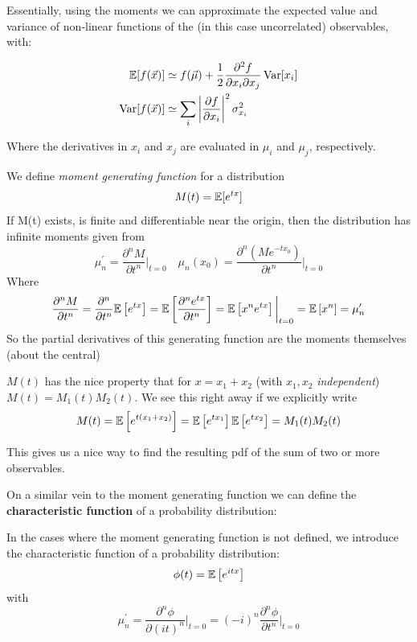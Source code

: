 Essentially, using the moments we can approximate the expected value and variance of non-linear functions of the (in this case uncorrelated) observables, with:

\begin{align*}
\mathbb{E}[f(\vec{x})] &\simeq f(\vec{\mu}) + \frac{1}{2}\frac{\partial^2f}{\partial x_i \partial x_j}\operatorname{Var}[x_i] \\
\operatorname{Var}[f(\vec{x})] &\simeq \sum_i \left| \frac{\partial f}{\partial x_i} \right|^2\sigma_{x_i}^2
\end{align*}

Where the derivatives in $x_i$ and $x_j$ are evaluated in $\mu_i$ and $\mu_j$, respectively.
\begin{definition}
	We define \emph{moment generating function} for a distribution 
	\[
	M(t) = \mathbb{E}[e^{tx}]
	\]
	If M(t) exists, is finite and differentiable near the origin, then the distribution has infinite moments given from
	\[
	\mu^\prime_n = \frac{\partial^n M}{\partial t^n}\bigg\rvert_{t=0} \quad \mu_n(x_0) = \frac{\partial^n \left( Me^{-tx_0} \right)}{\partial t^n}\bigg\rvert_{t=0}
	\]
	Where
	\[
	\frac{\partial^n M}{\partial t^n} = \frac{\partial^n}{\partial t^n} \mathbb{E}\left[e^{tx}\right] =  \mathbb{E}\left[\frac{\partial^ne^{tx}}{\partial t^n}\right] = \mathbb{E}\left[x^ne^{tx}\right]\bigg\rvert_{t=0} = \mathbb{E}\left[ x^n \right] = \mu_n^\prime
	\]
	So the partial derivatives of this generating function are the moments themselves (about the central)
\end{definition}
	
$M(t)$ has the nice property that for $x=x_1+x_2$ (with $x_1,x_2$ \emph{independent}) $M(t)=M_1(t)M_2(t)$. We see this right away if we explicitly write 
	\[
	M(t) = \mathbb{E}\left[ e^{t(x_1+x_2)}\right] = \mathbb{E}\left[ e^{tx_1}\right]\mathbb{E}\left[ e^{tx_2}\right] = M_1(t)M_2(t)
	\]
	
This gives us a nice way to find the resulting pdf of the sum of two or more observables.

On a similar vein to the moment generating function we can define the \textbf{characteristic function} of a probability distribution:

\begin{definition}
	In the cases where the moment generating function is not defined, we introduce the characteristic function of a probability distribution:
	\[
	\phi(t) = \mathbb{E}\left[ e^{itx} \right]
	\]
	with
	\[
	\mu_n^\prime = \frac{\partial^n \phi}{\partial (it)^n}\bigg\rvert_{t=0} = (-i)^n\frac{\partial^n \phi}{\partial t^n}\bigg\rvert_{t=0}
	\]
\end{definition}


